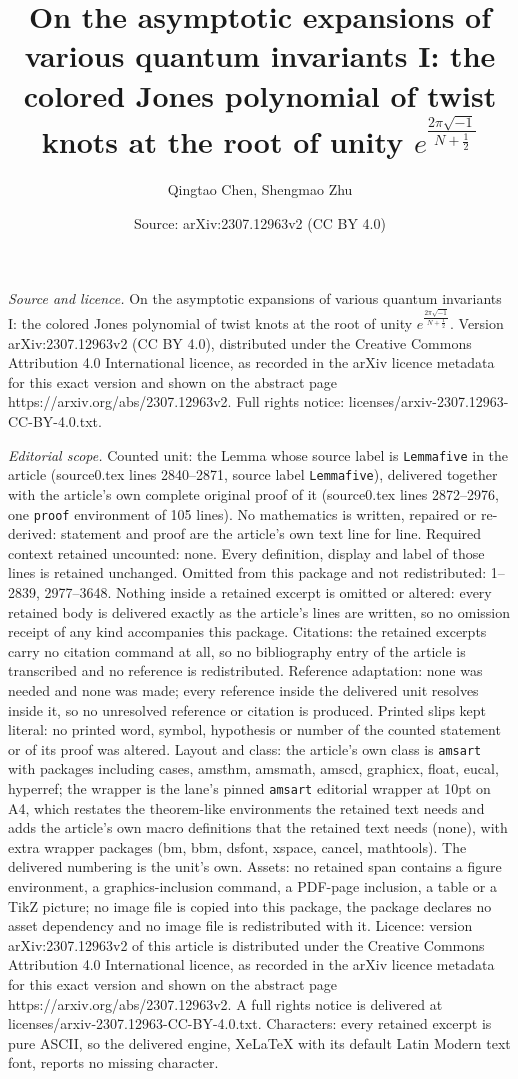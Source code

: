 \documentclass[10pt,a4paper]{amsart}
\title[On the asymptotic expansions of various quantum invariants I]{On the asymptotic expansions of various quantum invariants I: the colored Jones polynomial of twist knots at the root of unity $e^{\frac{2\pi\sqrt{-1}}{N+\frac{1}{2}}}$}
\author{Qingtao Chen, Shengmao Zhu}
\date{Source: arXiv:2307.12963v2 (CC BY 4.0)}
\begin{document}
\maketitle

\noindent\emph{Source and licence.} On the asymptotic expansions of various quantum invariants I: the colored Jones polynomial of twist knots at the root of unity $e^{\frac{2\pi\sqrt{-1}}{N+\frac{1}{2}}}$. Version arXiv:2307.12963v2 (CC BY 4.0), distributed under the Creative Commons Attribution 4.0 International licence, as recorded in the arXiv licence metadata for this exact version and shown on the abstract page https://arxiv.org/abs/2307.12963v2. Full rights notice: licenses/arxiv-2307.12963-CC-BY-4.0.txt.\par\smallskip

\noindent\textit{Editorial scope.} Counted unit: the Lemma whose source label is \texttt{Lemmafive} in the article (source0.tex lines 2840--2871, source label \texttt{Lemmafive}), delivered together with the article's own complete original proof of it (source0.tex lines 2872--2976, one \texttt{proof} environment of 105 lines). No mathematics is written, repaired or re-derived: statement and proof are the article's own text line for line. Required context retained uncounted: none. Every definition, display and label of those lines is retained unchanged. Omitted from this package and not redistributed: 1--2839, 2977--3648. Nothing inside a retained excerpt is omitted or altered: every retained body is delivered exactly as the article's lines are written, so no omission receipt of any kind accompanies this package. Citations: the retained excerpts carry no citation command at all, so no bibliography entry of the article is transcribed and no reference is redistributed. Reference adaptation: none was needed and none was made; every reference inside the delivered unit resolves inside it, so no unresolved reference or citation is produced. Printed slips kept literal: no printed word, symbol, hypothesis or number of the counted statement or of its proof was altered. Layout and class: the article's own class is \texttt{amsart} with packages including cases, amsthm, amsmath, amscd, graphicx, float, eucal, hyperref; the wrapper is the lane's pinned \texttt{amsart} editorial wrapper at 10pt on A4, which restates the theorem-like environments the retained text needs and adds the article's own macro definitions that the retained text needs (none), with extra wrapper packages (bm, bbm, dsfont, xspace, cancel, mathtools). The delivered numbering is the unit's own. Assets: no retained span contains a figure environment, a graphics-inclusion command, a PDF-page inclusion, a table or a TikZ picture; no image file is copied into this package, the package declares no asset dependency and no image file is redistributed with it. Licence: version arXiv:2307.12963v2 of this article is distributed under the Creative Commons Attribution 4.0 International licence, as recorded in the arXiv licence metadata for this exact version and shown on the abstract page https://arxiv.org/abs/2307.12963v2. A full rights notice is delivered at licenses/arxiv-2307.12963-CC-BY-4.0.txt. Characters: every retained excerpt is pure ASCII, so the delivered engine, XeLaTeX with its default Latin Modern text font, reports no missing character.
\end{document}
